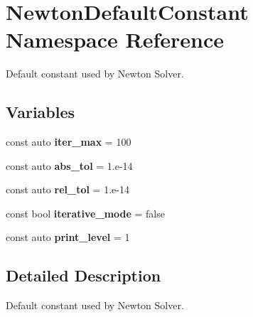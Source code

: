 \hypertarget{namespaceNewtonDefaultConstant}{}\section{Newton\+Default\+Constant Namespace Reference}
\label{namespaceNewtonDefaultConstant}


Default constant used by Newton Solver.  


\subsection*{Variables}
\begin{DoxyCompactItemize}
\item 
\mbox{\label{namespaceNewtonDefaultConstant_a54fd5f536239148e4b6944fc4ca69b68}} 
const auto {\bfseries iter\+\_\+max} = 100
\item 
\mbox{\label{namespaceNewtonDefaultConstant_ac1eef27763caad41ca330703399e1225}} 
const auto {\bfseries abs\+\_\+tol} = 1.e-\/14
\item 
\mbox{\label{namespaceNewtonDefaultConstant_a120c87f4ed67c7d6cfcdb2588d2713ea}} 
const auto {\bfseries rel\+\_\+tol} = 1.e-\/14
\item 
\mbox{\label{namespaceNewtonDefaultConstant_a629a0f60e031b0323fb11977b84e07a5}} 
const bool {\bfseries iterative\+\_\+mode} = false
\item 
\mbox{\label{namespaceNewtonDefaultConstant_a3ed2f048dc8a07bd1ee5b614baeb4a06}} 
const auto {\bfseries print\+\_\+level} = 1
\end{DoxyCompactItemize}


\subsection{Detailed Description}
Default constant used by Newton Solver. 